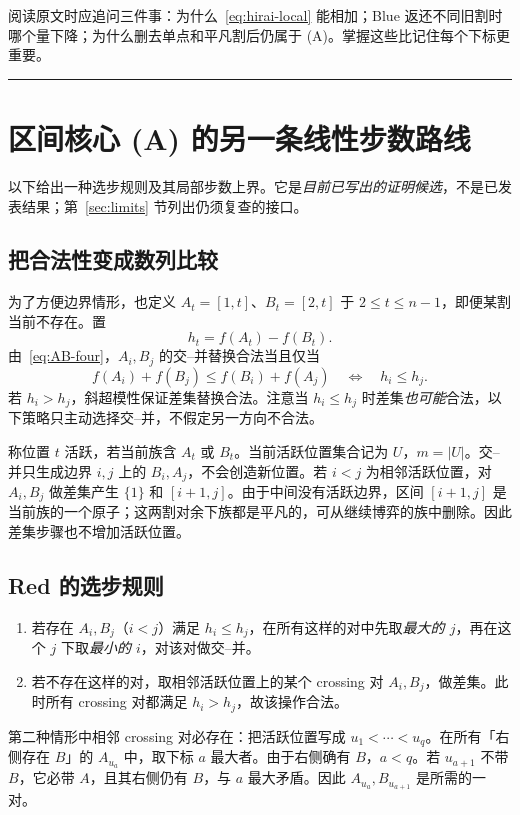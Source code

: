 \documentclass[UTF8,11pt,a4paper]{ctexart}
\newcommand{\ownrule}{\par\medskip\noindent\textcolor{red}{\rule{\linewidth}{1pt}}\par\medskip}
\begin{document}
阅读原文时应追问三件事：为什么~\eqref{eq:hirai-local} 能相加；Blue 返还不同旧割时哪个量下降；为什么删去单点和平凡割后仍属于 (A)。掌握这些比记住每个下标更重要。

\clearpage
\ownrule
\section{区间核心 (A) 的另一条线性步数路线}

\label{sec:improvement}
以下给出一种选步规则及其局部步数上界。它是\emph{目前已写出的证明候选}，不是已发表结果；第~\ref{sec:limits} 节列出仍须复查的接口。

\subsection{把合法性变成数列比较}

为了方便边界情形，也定义 $A_t=[1,t]$、$B_t=[2,t]$ 于 $2\le t\le n-1$，即便某割当前不存在。置
\begin{equation}\label{eq:h}
h_t=f(A_t)-f(B_t).
\end{equation}
由~\eqref{eq:AB-four}，$A_i,B_j$ 的交--并替换合法当且仅当
\begin{equation}\label{eq:hcomp}
f(A_i)+f(B_j)\le f(B_i)+f(A_j)
\quad\Longleftrightarrow\quad h_i\le h_j.
\end{equation}
若 $h_i>h_j$，斜超模性保证差集替换合法。注意当 $h_i\le h_j$ 时差集\emph{也可能}合法，以下策略只主动选择交--并，不假定另一方向不合法。

称位置 $t$ 活跃，若当前族含 $A_t$ 或 $B_t$。当前活跃位置集合记为 $U$，$m=|U|$。交--并只生成边界 $i,j$ 上的 $B_i,A_j$，不会创造新位置。若 $i<j$ 为相邻活跃位置，对 $A_i,B_j$ 做差集产生 $\{1\}$ 和 $[i+1,j]$。由于中间没有活跃边界，区间 $[i+1,j]$ 是当前族的一个原子；这两割对余下族都是平凡的，可从继续博弈的族中删除。因此差集步骤也不增加活跃位置。

\subsection{Red 的选步规则}

\begin{enumerate}
\item 若存在 $A_i,B_j$（$i<j$）满足 $h_i\le h_j$，在所有这样的对中先取\emph{最大的 $j$}，再在这个 $j$ 下取\emph{最小的 $i$}，对该对做交--并。
\item 若不存在这样的对，取相邻活跃位置上的某个 crossing 对 $A_i,B_j$，做差集。此时所有 crossing 对都满足 $h_i>h_j$，故该操作合法。
\end{enumerate}
第二种情形中相邻 crossing 对必存在：把活跃位置写成 $u_1<\cdots<u_q$。在所有「右侧存在 $B$」的 $A_{u_a}$ 中，取下标 $a$ 最大者。由于右侧确有 $B$，$a<q$。若 $u_{a+1}$ 不带 $B$，它必带 $A$，且其右侧仍有 $B$，与 $a$ 最大矛盾。因此 $A_{u_a},B_{u_{a+1}}$ 是所需的一对。
\end{document}
